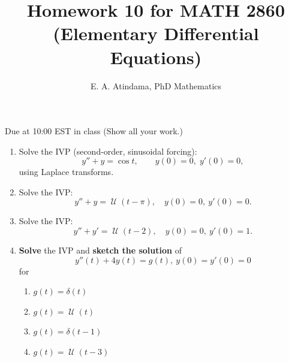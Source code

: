 \documentclass[a4paper,11pt,reqno]{amsart}
\title[MATH 2860 (Elementary Differential Equations)]{Homework 10 for MATH 2860 (Elementary Differential Equations)}
\author[Emmanuel Atindama]{E. A. Atindama, PhD Mathematics}
\numberwithin{equation}{section}
\DeclareMathOperator{\hstep}{\mathscr{U}}
\begin{document}
\maketitle

Due at 10:00 EST in class (\textcolor{red!20}{Show all your work.})

\begin{enumerate}[1.]
  \item Solve the IVP (second-order, sinusoidal forcing):
      \[
      y''+y=\cos t,\qquad y(0)=0,\; y'(0)=0,
      \]
      using Laplace transforms.


  \item Solve the IVP:
      \[
      y'' + y = \hstep(t-\pi), \quad y(0)=0,\ y'(0)=0.
      \]
  \item Solve the IVP:
       \[
      y'' + y' = \hstep(t-2), \quad y(0)=0,\ y'(0)=1.
      \]
  \item \textbf{Solve} the IVP and \textbf{sketch the solution} of
      \[
        y''(t) + 4 y(t) = g(t),\ y(0)=y'(0)=0
      \]
      for

      \begin{enumerate}
      \item \(g(t) = \delta(t)\) 
      \item \(g(t) = \hstep(t)\) 
      \item \(g(t) = \delta(t-1)\) 
      \item \(g(t) = \hstep(t-3)\)
      \end{enumerate}
\end{enumerate}
  
\end{document}
